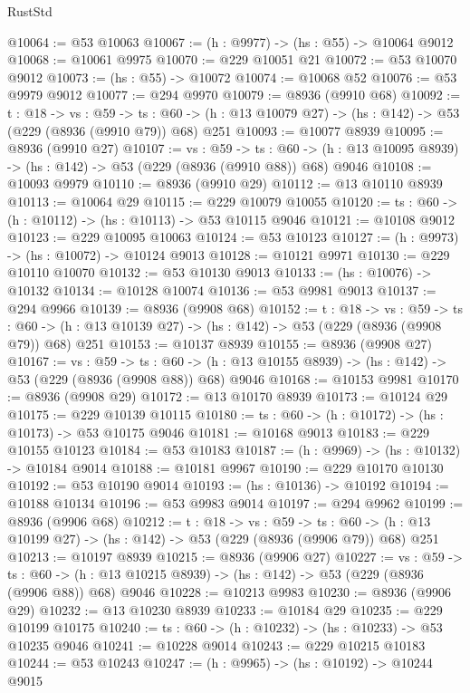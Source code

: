 \begin{lexlean}{RustStd}
\begin{coremodule}
@10064 := @53 @10063
@10067 := (h : @9977) -> (hs : @55) -> @10064 @9012
@10068 := @10061 @9975
@10070 := @229 @10051 @21
@10072 := @53 @10070 @9012
@10073 := (hs : @55) -> @10072
@10074 := @10068 @52
@10076 := @53 @9979 @9012
@10077 := @294 @9970
@10079 := @8936 (@9910 @68)
@10092 := {t : @18} ->
  {vs : @59} ->
  {ts : @60} -> (h : @13 @10079 @27) -> (hs : @142) -> @53 (@229 (@8936 (@9910 @79)) @68) @251
@10093 := @10077 @8939
@10095 := @8936 (@9910 @27)
@10107 := {vs : @59} ->
  {ts : @60} -> (h : @13 @10095 @8939) -> (hs : @142) -> @53 (@229 (@8936 (@9910 @88)) @68) @9046
@10108 := @10093 @9979
@10110 := @8936 (@9910 @29)
@10112 := @13 @10110 @8939
@10113 := @10064 @29
@10115 := @229 @10079 @10055
@10120 := {ts : @60} -> (h : @10112) -> (hs : @10113) -> @53 @10115 @9046
@10121 := @10108 @9012
@10123 := @229 @10095 @10063
@10124 := @53 @10123
@10127 := (h : @9973) -> (hs : @10072) -> @10124 @9013
@10128 := @10121 @9971
@10130 := @229 @10110 @10070
@10132 := @53 @10130 @9013
@10133 := (hs : @10076) -> @10132
@10134 := @10128 @10074
@10136 := @53 @9981 @9013
@10137 := @294 @9966
@10139 := @8936 (@9908 @68)
@10152 := {t : @18} ->
  {vs : @59} ->
  {ts : @60} -> (h : @13 @10139 @27) -> (hs : @142) -> @53 (@229 (@8936 (@9908 @79)) @68) @251
@10153 := @10137 @8939
@10155 := @8936 (@9908 @27)
@10167 := {vs : @59} ->
  {ts : @60} -> (h : @13 @10155 @8939) -> (hs : @142) -> @53 (@229 (@8936 (@9908 @88)) @68) @9046
@10168 := @10153 @9981
@10170 := @8936 (@9908 @29)
@10172 := @13 @10170 @8939
@10173 := @10124 @29
@10175 := @229 @10139 @10115
@10180 := {ts : @60} -> (h : @10172) -> (hs : @10173) -> @53 @10175 @9046
@10181 := @10168 @9013
@10183 := @229 @10155 @10123
@10184 := @53 @10183
@10187 := (h : @9969) -> (hs : @10132) -> @10184 @9014
@10188 := @10181 @9967
@10190 := @229 @10170 @10130
@10192 := @53 @10190 @9014
@10193 := (hs : @10136) -> @10192
@10194 := @10188 @10134
@10196 := @53 @9983 @9014
@10197 := @294 @9962
@10199 := @8936 (@9906 @68)
@10212 := {t : @18} ->
  {vs : @59} ->
  {ts : @60} -> (h : @13 @10199 @27) -> (hs : @142) -> @53 (@229 (@8936 (@9906 @79)) @68) @251
@10213 := @10197 @8939
@10215 := @8936 (@9906 @27)
@10227 := {vs : @59} ->
  {ts : @60} -> (h : @13 @10215 @8939) -> (hs : @142) -> @53 (@229 (@8936 (@9906 @88)) @68) @9046
@10228 := @10213 @9983
@10230 := @8936 (@9906 @29)
@10232 := @13 @10230 @8939
@10233 := @10184 @29
@10235 := @229 @10199 @10175
@10240 := {ts : @60} -> (h : @10232) -> (hs : @10233) -> @53 @10235 @9046
@10241 := @10228 @9014
@10243 := @229 @10215 @10183
@10244 := @53 @10243
@10247 := (h : @9965) -> (hs : @10192) -> @10244 @9015

\end{coremodule}
\end{lexlean}
